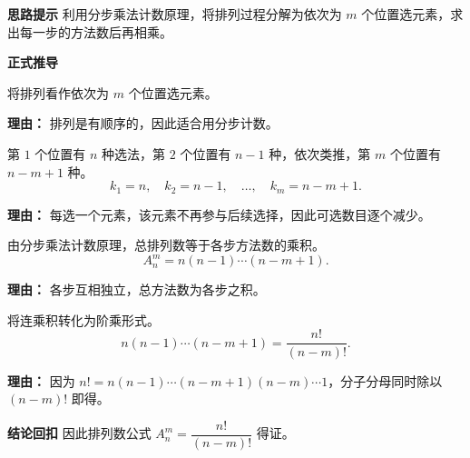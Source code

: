 \begin{proofbox}
	\textbf{\textcolor{CProof}{思路提示}}
	利用分步乘法计数原理，将排列过程分解为依次为 $m$ 个位置选元素，求出每一步的方法数后再相乘。

	\medskip
	\textbf{\textcolor{CProof}{正式推导}}
	\begin{description}[style=nextline, leftmargin=2.8em, labelsep=0.5em, itemsep=0.55em]
		\item[\textbf{步骤一（分步建模）：}]
			将排列看作依次为 $m$ 个位置选元素。
			\par\textbf{理由：} 排列是有顺序的，因此适合用分步计数。
		\item[\textbf{步骤二（各步方法数）：}]
			第 $1$ 个位置有 $n$ 种选法，第 $2$ 个位置有 $n-1$ 种，依次类推，第 $m$ 个位置有 $n-m+1$ 种。
			\[
				k_1 = n,\quad k_2 = n-1,\quad \dots,\quad k_m = n-m+1.
			\]
			\par\textbf{理由：} 每选一个元素，该元素不再参与后续选择，因此可选数目逐个减少。
		\item[\textbf{步骤三（乘法原理）：}]
			由分步乘法计数原理，总排列数等于各步方法数的乘积。
			\[
				A_n^m = n(n-1)\cdots (n-m+1).
			\]
			\par\textbf{理由：} 各步互相独立，总方法数为各步之积。
		\item[\textbf{步骤四（阶乘化简）：}]
			将连乘积转化为阶乘形式。
			\[
				n(n-1)\cdots (n-m+1) = \frac{n!}{(n-m)!}.
			\]
			\par\textbf{理由：} 因为 $n! = n(n-1)\cdots (n-m+1)(n-m)\cdots 1$，分子分母同时除以 $(n-m)!$ 即得。
	\end{description}

	\medskip
	\textbf{\textcolor{CProof}{结论回扣}}
	因此排列数公式 $A_n^m = \dfrac{n!}{(n-m)!}$ 得证。
\end{proofbox}
